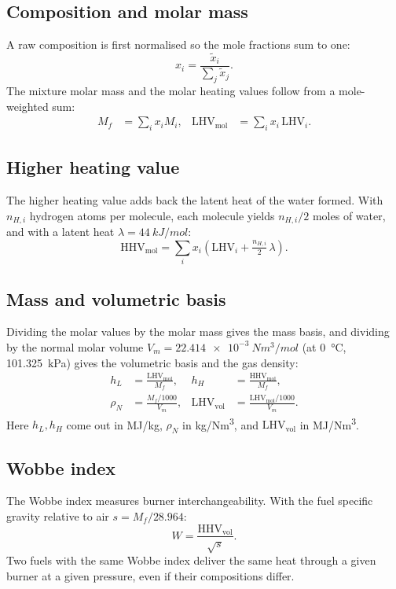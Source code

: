 \documentclass[11pt,a4paper]{article}
\begin{document}
\subsection{Composition and molar mass}
A raw composition is first normalised so the mole fractions sum to one:
\begin{equation}
x_i = \frac{\tilde x_i}{\sum_j \tilde x_j}.
\end{equation}
The mixture molar mass and the molar heating values follow from a mole-weighted
sum:
\begin{align}
M_f &= \sum_i x_i M_i, &
\mathrm{LHV}_\mathrm{mol} &= \sum_i x_i\, \mathrm{LHV}_i .
\end{align}

\subsection{Higher heating value}
The higher heating value adds back the latent heat of the water formed. With
$n_{H,i}$ hydrogen atoms per molecule, each molecule yields $n_{H,i}/2$ moles of
water, and with a latent heat $\lambda=\SI{44}{kJ/mol}$:
\begin{equation}
\mathrm{HHV}_\mathrm{mol} = \sum_i x_i\left(\mathrm{LHV}_i + \tfrac{n_{H,i}}{2}\,\lambda\right).
\end{equation}

\subsection{Mass and volumetric basis}
Dividing the molar values by the molar mass gives the mass basis, and dividing by
the normal molar volume $V_m=\SI{22.414e-3}{Nm^3/mol}$ (at \SI{0}{\celsius},
\SI{101.325}{kPa}) gives the volumetric basis and the gas density:
\begin{align}
h_L &= \frac{\mathrm{LHV}_\mathrm{mol}}{M_f}, &
h_H &= \frac{\mathrm{HHV}_\mathrm{mol}}{M_f}, \\[2pt]
\rho_N &= \frac{M_f/1000}{V_m}, &
\mathrm{LHV}_\mathrm{vol} &= \frac{\mathrm{LHV}_\mathrm{mol}/1000}{V_m}.
\end{align}
Here $h_L,h_H$ come out in \si{MJ/kg}, $\rho_N$ in \si{kg/Nm^3}, and
$\mathrm{LHV}_\mathrm{vol}$ in \si{MJ/Nm^3}.

\subsection{Wobbe index}
The Wobbe index measures burner interchangeability. With the fuel specific
gravity relative to air $s=M_f/28.964$:
\begin{equation}
W = \frac{\mathrm{HHV}_\mathrm{vol}}{\sqrt{s}} .
\end{equation}
Two fuels with the same Wobbe index deliver the same heat through a given burner
at a given pressure, even if their compositions differ.
\end{document}
